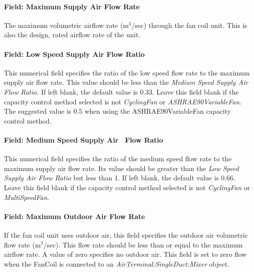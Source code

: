 \paragraph{Field: Maximum Supply Air Flow Rate}\label{field-maximum-supply-air-flow-rate}

The maximum volumetric airflow rate (m\(^{3}\)/sec) through the fan coil unit. This is also the design, rated airflow rate of the unit.

\paragraph{Field: Low Speed Supply Air Flow Ratio}\label{field-low-speed-supply-air-flow-ratio-000}

This numerical field specifies the ratio of the low speed flow rate to the maximum supply air flow rate. This value should be less than the \emph{Medium Speed Supply Air Flow Ratio.} If left blank, the default value is 0.33. Leave this field blank if the capacity control method selected is not \emph{CyclingFan} or \emph{ASHRAE90VariableFan}. The suggested value is 0.5 when using the ASHRAE90VariableFan capacity control method.

\paragraph{Field: Medium Speed Supply Air~ Flow Ratio}\label{field-medium-speed-supply-air-flow-ratio-000}

This numerical field specifies the ratio of the medium speed flow rate to the maximum supply air flow rate. Its value should be greater than the \emph{Low Speed Supply Air Flow Ratio} but less than 1. If left blank, the default value is 0.66. Leave this field blank if the capacity control method selected is not \emph{CyclingFan} or \emph{MultiSpeedFan}.

\paragraph{Field: Maximum Outdoor Air Flow Rate}\label{field-maximum-outdoor-air-flow-rate-002}

If the fan coil unit uses outdoor air, this field specifies the outdoor air volumetric flow rate (m\(^{3}\)/sec). This flow rate should be less than or equal to the maximum airflow rate. A value of zero specifies no outdoor air. This field is set to zero flow when the FanCoil is connected to an \textit{AirTerminal:SingleDuct:Mixer} object.

